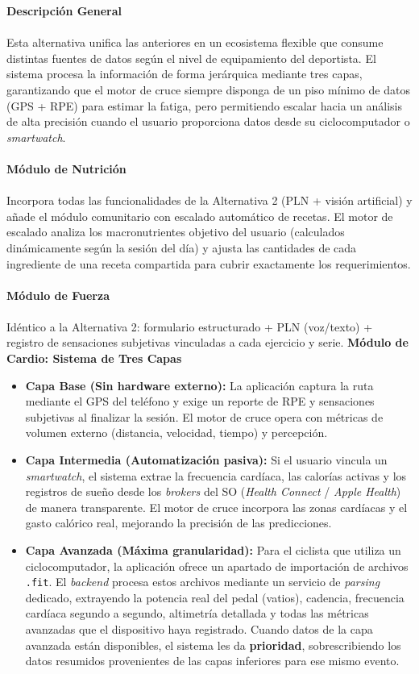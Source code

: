 \documentclass[12pt]{article}
\begin{document}
\textbf{Descripción General}
\\\\
Esta alternativa unifica las anteriores en un ecosistema flexible que consume distintas fuentes de datos según el nivel de equipamiento del deportista. El sistema procesa la información de forma jerárquica mediante tres capas, garantizando que el motor de cruce siempre disponga de un piso mínimo de datos (GPS + RPE) para estimar la fatiga, pero permitiendo escalar hacia un análisis de alta precisión cuando el usuario proporciona datos desde su ciclocomputador o \textit{smartwatch}.
\\\\
\textbf{Módulo de Nutrición}
\\\\
Incorpora todas las funcionalidades de la Alternativa 2 (PLN + visión artificial) y añade el módulo comunitario con escalado automático de recetas. El motor de escalado analiza los macronutrientes objetivo del usuario (calculados dinámicamente según la sesión del día) y ajusta las cantidades de cada ingrediente de una receta compartida para cubrir exactamente los requerimientos.
\\\\
\textbf{Módulo de Fuerza}
\\\\
Idéntico a la Alternativa 2: formulario estructurado + PLN (voz/texto) + registro de sensaciones subjetivas vinculadas a cada ejercicio y serie.
\newpage
\textbf{Módulo de Cardio: Sistema de Tres Capas}

\begin{itemize}
    \item \textbf{Capa Base (Sin hardware externo):} La aplicación captura la ruta mediante el GPS del teléfono y exige un reporte de RPE y sensaciones subjetivas al finalizar la sesión. El motor de cruce opera con métricas de volumen externo (distancia, velocidad, tiempo) y percepción.
    \item \textbf{Capa Intermedia (Automatización pasiva):} Si el usuario vincula un \textit{smartwatch}, el sistema extrae la frecuencia cardíaca, las calorías activas y los registros de sueño desde los \textit{brokers} del SO (\textit{Health Connect} / \textit{Apple Health}) de manera transparente. El motor de cruce incorpora las zonas cardíacas y el gasto calórico real, mejorando la precisión de las predicciones.
    \item \textbf{Capa Avanzada (Máxima granularidad):} Para el ciclista que utiliza un ciclocomputador, la aplicación ofrece un apartado de importación de archivos \texttt{.fit}. El \textit{backend} procesa estos archivos mediante un servicio de \textit{parsing} dedicado, extrayendo la potencia real del pedal (vatios), cadencia, frecuencia cardíaca segundo a segundo, altimetría detallada y todas las métricas avanzadas que el dispositivo haya registrado. Cuando datos de la capa avanzada están disponibles, el sistema les da \textbf{prioridad}, sobrescribiendo los datos resumidos provenientes de las capas inferiores para ese mismo evento.
\end{itemize}
\end{document}
